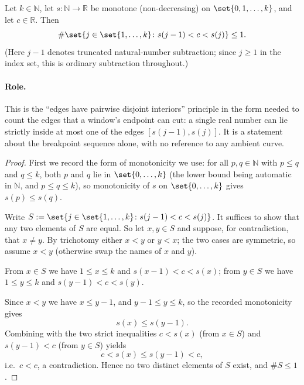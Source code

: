 \begin{helper}
  Let $k \in \mathbb{N}$, let $s \colon \mathbb{N} \to \mathbb{R}$ be monotone (non-decreasing) on
  $\set{0,1,\dots,k}$, and let $c \in \mathbb{R}$. Then
  \[
    \#\set{ j \in \set{1,\dots,k} \colon s(j-1) < c < s(j) } \le 1
    .
  \]
  (Here $j-1$ denotes truncated natural-number subtraction; since $j \ge 1$ in the index set, this
  is ordinary subtraction throughout.)

  \paragraph{Role.} This is the ``edges have pairwise disjoint interiors'' principle in the form
  needed to count the edges that a window's endpoint can cut: a single real number can lie
  strictly inside at most one of the edges $[s(j-1),s(j)]$. It is a statement about the breakpoint
  sequence alone, with no reference to any ambient curve.
\end{helper}
\begin{proof}
  First we record the form of monotonicity we use: for all $p, q \in \mathbb{N}$ with $p \le q$
  and $q \le k$, both $p$ and $q$ lie in $\set{0,\dots,k}$ (the lower bound being automatic in
  $\mathbb{N}$, and $p \le q \le k$), so monotonicity of $s$ on $\set{0,\dots,k}$ gives
  $s(p) \le s(q)$.

  Write $S := \set{ j \in \set{1,\dots,k} \colon s(j-1) < c < s(j) }$. It suffices to show that any
  two elements of $S$ are equal. So let $x, y \in S$ and suppose, for contradiction, that
  $x \ne y$. By trichotomy either $x < y$ or $y < x$; the two cases are symmetric, so assume
  $x < y$ (otherwise swap the names of $x$ and $y$).

  From $x \in S$ we have $1 \le x \le k$ and $s(x-1) < c < s(x)$; from $y \in S$ we have
  $1 \le y \le k$ and $s(y-1) < c < s(y)$.

  Since $x < y$ we have $x \le y-1$, and $y - 1 \le y \le k$, so the recorded monotonicity gives
  \[
    s(x) \le s(y-1)
    .
  \]
  Combining with the two strict inequalities $c < s(x)$ (from $x \in S$) and $s(y-1) < c$ (from
  $y \in S$) yields
  \[
    c < s(x) \le s(y-1) < c
    ,
  \]
  i.e.\ $c < c$, a contradiction. Hence no two distinct elements of $S$ exist, and
  $\#S \le 1$.
\end{proof}
